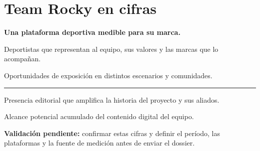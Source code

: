 \section{Team Rocky en cifras}

{\Large\bfseries Una plataforma deportiva medible para su marca.\par}
\vspace{10mm}

\begin{minipage}[t]{0.47\textwidth}
  \vspace{4mm}
  Deportistas que representan al equipo, sus valores y las marcas que lo acompañan.
\end{minipage}\hfill
\begin{minipage}[t]{0.47\textwidth}
  \vspace{4mm}
  Oportunidades de exposición en distintos escenarios y comunidades.
\end{minipage}

\vspace{16mm}
\color{rockymidgray}\rule{\textwidth}{0.4pt}\color{rockyblack}
\vspace{12mm}

\begin{minipage}[t]{0.47\textwidth}
  \vspace{4mm}
  Presencia editorial que amplifica la historia del proyecto y sus aliados.
\end{minipage}\hfill
\begin{minipage}[t]{0.47\textwidth}
  \vspace{4mm}
  Alcance potencial acumulado del contenido digital del equipo.
\end{minipage}

\vfill
\colorbox{rockygray}{\parbox{0.94\textwidth}{\small\textbf{Validación pendiente:} confirmar estas cifras y definir el período, las plataformas y la fuente de medición antes de enviar el dossier.}}
\newpage
